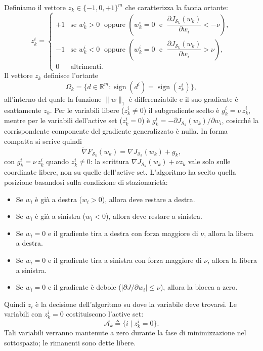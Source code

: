 \documentclass[a4paper,12pt]{article}
\numberwithin{equation}{section}
\numberwithin{figure}{section}
\numberwithin{table}{section}
\begin{document}
Definiamo il vettore $z_k \in \{-1,0,+1\}^m$ che caratterizza la faccia ortante:
\begin{equation}
z_k^i =
\begin{cases}
+1 & \text{se } w_k^i > 0 \;\text{ oppure } \left( w_k^i = 0 \;\text{ e }\; \dfrac{\partial J_{\mathcal{S}_k}(w_k)}{\partial w_i} < -\nu \right), \\[12pt]
-1 & \text{se } w_k^i < 0 \;\text{ oppure } \left( w_k^i = 0 \;\text{ e }\; \dfrac{\partial J_{\mathcal{S}_k}(w_k)}{\partial w_i} > \nu \right), \\[12pt]
0 & \text{altrimenti}.
\end{cases} \tag{5.44}\label{eq:5_44}
\end{equation}
Il vettore $z_k$ definisce l'ortante
\[
\Omega_k = \{ d \in \mathbb{R}^m : \operatorname{sign}(d^i) = \operatorname{sign}(z_k^i) \}, \tag{5.45}\label{eq:5_45}
\]
all'interno del quale la funzione $\|w\|_1$ è differenziabile e il suo gradiente
è esattamente $z_k$. Per le variabili libere ($z_k^i \neq 0$) il subgradiente
scelto è $g_k^i = \nu\,z_k^i$, mentre per le variabili dell'active set
($z_k^i = 0$) è $g_k^i = -\partial J_{\mathcal{S}_k}(w_k)/\partial w_i$,
cosicché la corrispondente componente del gradiente generalizzato è nulla.
In forma compatta si scrive quindi
\[
\widetilde{\nabla}F_{\mathcal{S}_k}(w_k) = \nabla J_{\mathcal{S}_k}(w_k) + g_k,
\]
con $g_k^i = \nu\,z_k^i$ quando $z_k^i \neq 0$: la scrittura
$\nabla J_{\mathcal{S}_k}(w_k) + \nu z_k$ vale solo sulle coordinate libere,
non su quelle dell'active set. L'algoritmo ha scelto quella posizione basandosi sulla condizione di stazionarietà:
\begin{itemize}
  \item Se $w_i$ è già a destra ($w_i > 0$), allora deve restare a destra.
  \item Se $w_i$ è già a sinistra ($w_i < 0$), allora deve restare a sinistra.
  \item Se $w_i = 0$ e il gradiente tira a destra con forza maggiore di $\nu$, allora la libera a destra.
  \item Se $w_i = 0$ e il gradiente tira a sinistra con forza maggiore di $\nu$, allora la libera a sinistra.
  \item Se $w_i = 0$ e il gradiente è debole ($|\partial J/\partial w_i| \le \nu$), allora la blocca a zero.
\end{itemize}
Quindi $z_i$ è la decisione dell'algoritmo su dove la variabile deve trovarsi. Le variabili con $z_k^i = 0$ costituiscono l'active
set:
\begin{equation}
\mathcal{A}_k \triangleq \{ i \mid z_k^i = 0 \}. \tag{5.46}\label{eq:5_46}
\end{equation}
Tali variabili verranno mantenute a zero durante la fase di minimizzazione nel
sottospazio; le rimanenti sono dette libere.
\end{document}
